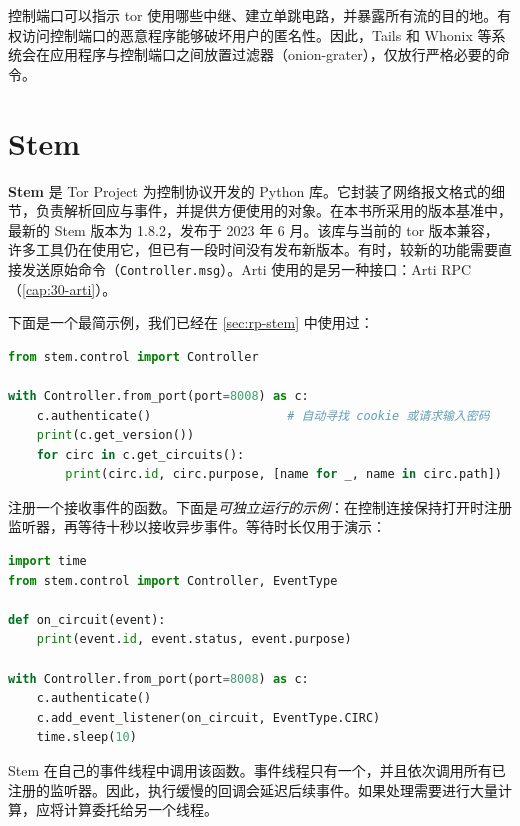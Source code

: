 \begin{attenzione}
控制端口可以指示 tor 使用哪些中继、建立单跳电路，并暴露所有流的目的地。有权访问控制端口的恶意程序能够破坏用户的匿名性。因此，Tails 和 Whonix 等系统会在应用程序与控制端口之间放置过滤器（onion-grater），仅放行严格必要的命令。
\end{attenzione}

\section{Stem}\label{sec:stem-libreria}

\textbf{Stem} 是 Tor Project 为控制协议开发的 Python 库。它封装了网络报文格式的细节，负责解析回应与事件，并提供方便使用的对象。在本书所采用的版本基准中，最新的 Stem 版本为 1.8.2，发布于 2023 年 6 月。该库与当前的 tor 版本兼容，许多工具仍在使用它，但已有一段时间没有发布新版本。有时，较新的功能需要直接发送原始命令（\texttt{Controller.msg}）。Arti 使用的是另一种接口：Arti RPC（\cref{cap:30-arti}）。

下面是一个最简示例，我们已经在 \cref{sec:rp-stem} 中使用过：
\begin{lstlisting}[language=Python]
from stem.control import Controller

with Controller.from_port(port=8008) as c:
    c.authenticate()                   # 自动寻找 cookie 或请求输入密码
    print(c.get_version())
    for circ in c.get_circuits():
        print(circ.id, circ.purpose, [name for _, name in circ.path])
\end{lstlisting}

注册一个接收事件的函数。下面是\emph{可独立运行的示例}：在控制连接保持打开时注册监听器，再等待十秒以接收异步事件。等待时长仅用于演示：
\begin{lstlisting}[language=Python]
import time
from stem.control import Controller, EventType

def on_circuit(event):
    print(event.id, event.status, event.purpose)

with Controller.from_port(port=8008) as c:
    c.authenticate()
    c.add_event_listener(on_circuit, EventType.CIRC)
    time.sleep(10)
\end{lstlisting}
Stem 在自己的事件线程中调用该函数。事件线程只有一个，并且依次调用所有已注册的监听器。因此，执行缓慢的回调会延迟后续事件。如果处理需要进行大量计算，应将计算委托给另一个线程。

